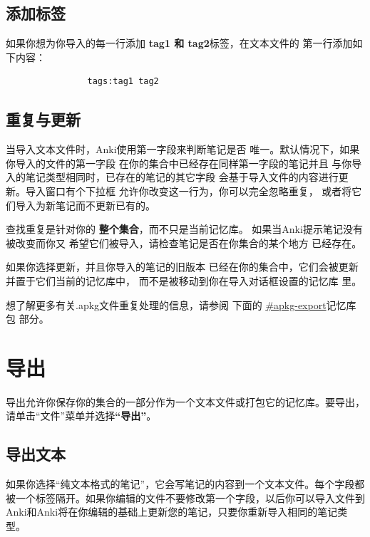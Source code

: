 \documentclass[a4paper]{book}
\begin{document}
			\section{添加标签}
			
			如果你想为你导入的每一行添加 \textbf{tag1 和 tag2}标签，在文本文件的 第一行添加如下内容：
			
			\begin{shaded}\begin{verbatim}
				tags:tag1 tag2
				\end{verbatim}\end{shaded}
			
			\section{重复与更新}
			
			当导入文本文件时，Anki使用第一字段来判断笔记是否 唯一。默认情况下，如果你导入的文件的第一字段 在你的集合中已经存在同样第一字段的笔记并且 与你导入的笔记类型相同时，已存在的笔记的其它字段 会基于导入文件的内容进行更新。导入窗口有个下拉框 允许你改变这一行为，你可以完全忽略重复， 或者将它们导入为新笔记而不更新已有的。
			
			\begin{shaded}
				查找重复是针对你的 \textbf{整个集合}，而不只是当前记忆库。 如果当Anki提示笔记没有被改变而你又 希望它们被导入，请检查笔记是否在你集合的某个地方 已经存在。
			\end{shaded}
			
			如果你选择更新，并且你导入的笔记的旧版本 已经在你的集合中，它们会被更新并置于它们当前的记忆库中， 而不是被移动到你在导入对话框设置的记忆库 里。
			
			想了解更多有关.apkg文件重复处理的信息，请参阅 下面的
			\url{#apkg-export}记忆库包 部分。
			
			\chapter{导出}\label{}
			
			导出允许你保存你的集合的一部分作为一个文本文件或打包它的记忆库。要导出，请单击“文件”菜单并选择\textbf{“导出”}。
			\section{导出文本}
			
			如果你选择“纯文本格式的笔记”，它会写笔记的内容到一个文本文件。每个字段都被一个标签隔开。如果你编辑的文件不要修改第一个字段，以后你可以导入文件到Anki和Anki将在你编辑的基础上更新您的笔记，只要你重新导入相同的笔记类型。
			
\end{document}

